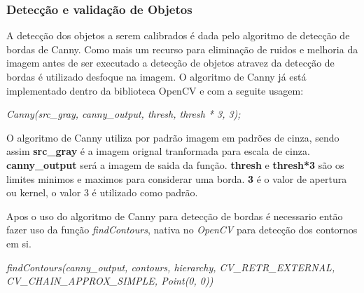 \subsubsection{Detecção e validação de Objetos}
A detecção dos objetos a serem calibrados é dada pelo algoritmo de detecção de bordas de Canny. Como mais um recurso para eliminação de ruidos e melhoria da imagem antes de ser executado a detecção de objetos atravez da detecção de bordas é utilizado desfoque na imagem. O algoritmo de Canny já está implementado dentro da biblioteca OpenCV e com a seguite usagem:
\begin{center}
\centering \textit{  Canny(src\_gray, canny\_output, thresh, thresh * 3, 3);}
\end{center}
O algoritmo de Canny utiliza por padrão imagem em padrões de cinza, sendo assim \textbf{src\_gray} é a imagem orignal tranformada para escala de cinza. \textbf{canny\_output} será a imagem de saida da função.
\textbf{thresh} e \textbf{thresh*3} são os limites minimos e maximos para considerar uma borda. \textbf{3} é o valor de apertura ou kernel, o valor 3 é utilizado como padrão.

Apos o uso do algoritmo de Canny para detecção de bordas é necessario então fazer uso da função \textit{findContours}, nativa no \textit{OpenCV} para detecção dos contornos em si.
\begin{center}
\centering \textit{ findContours(canny\_output, contours, hierarchy, CV\_RETR\_EXTERNAL, CV\_CHAIN\_APPROX\_SIMPLE, Point(0, 0))}
\end{center}


